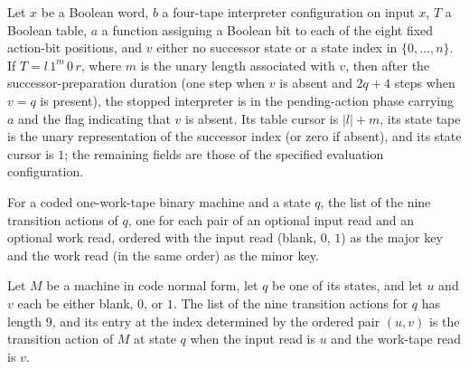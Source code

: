 \begin{lemma}
\label{Turing.timedCut_prepare_next}
\leanok
{}
Let $x$ be a Boolean word, $b$ a four-tape interpreter configuration on input $x$, $T$ a
Boolean table, $a$ a function assigning a Boolean bit to each of the eight fixed
action-bit positions, and $v$ either no successor state or a state index in
$\{0,\ldots,n\}$. If $T=l\,1^m\,0\,r$, where $m$ is the unary length associated
with $v$, then after the successor-preparation duration (one step when $v$ is absent and
$2q+4$ steps when $v=q$ is present), the stopped interpreter is in the pending-action
phase carrying $a$ and the flag indicating that $v$ is absent. Its table cursor is
$|l|+m$, its state tape is the unary representation of the successor index (or zero if
absent), and its state cursor is $1$; the remaining fields are those of the specified
evaluation configuration.
\end{lemma}

\begin{definition}
\label{Turing.timedCut_Actions}
\leanok
{}
For a coded one-work-tape binary machine and a state $q$, the list of the nine
transition actions of $q$, one for each pair of an optional input read and an
optional work read, ordered with the input read (blank, $0$, $1$) as the major
key and the work read (in the same order) as the minor key.
\end{definition}

\begin{lemma}
\label{Turing.timedCut_Actions_lookup}
\leanok
{}
Let $M$ be a machine in code normal form, let $q$ be one of its states, and let $u$ and
$v$ each be either blank, $0$, or $1$. The list of the nine transition actions for $q$
has length $9$, and its entry at the index determined by the ordered pair $(u,v)$ is the
transition action of $M$ at state $q$ when the input read is $u$ and the work-tape read
is $v$.
\end{lemma}

